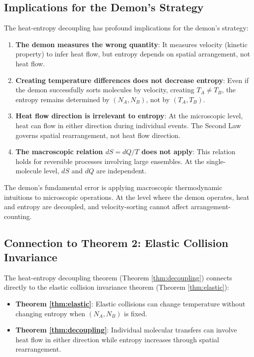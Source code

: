 \documentclass[10pt,twocolumn,letterpaper]{article}
\theoremstyle{definition}
\theoremstyle{remark}
\begin{document}
\subsection{Implications for the Demon's Strategy}

The heat-entropy decoupling has profound implications for the demon's strategy:

\begin{enumerate}
\item \textbf{The demon measures the wrong quantity}: It measures velocity (kinetic property) to infer heat flow, but entropy depends on spatial arrangement, not heat flow.

\item \textbf{Creating temperature differences does not decrease entropy}: Even if the demon successfully sorts molecules by velocity, creating $T_A \neq T_B$, the entropy remains determined by $(N_A, N_B)$, not by $(T_A, T_B)$.

\item \textbf{Heat flow direction is irrelevant to entropy}: At the microscopic level, heat can flow in either direction during individual events. The Second Law governs spatial rearrangement, not heat flow direction.

\item \textbf{The macroscopic relation $dS = dQ/T$ does not apply}: This relation holds for reversible processes involving large ensembles. At the single-molecule level, $dS$ and $dQ$ are independent.
\end{enumerate}

The demon's fundamental error is applying macroscopic thermodynamic intuitions to microscopic operations. At the level where the demon operates, heat and entropy are decoupled, and velocity-sorting cannot affect arrangement-counting.

\subsection{Connection to Theorem 2: Elastic Collision Invariance}

The heat-entropy decoupling theorem (Theorem \ref{thm:decoupling}) connects directly to the elastic collision invariance theorem (Theorem \ref{thm:elastic}):

\begin{itemize}
\item \textbf{Theorem \ref{thm:elastic}}: Elastic collisions can change temperature without changing entropy when $(N_A, N_B)$ is fixed.

\item \textbf{Theorem \ref{thm:decoupling}}: Individual molecular transfers can involve heat flow in either direction while entropy increases through spatial rearrangement.
\end{itemize}
\end{document}
